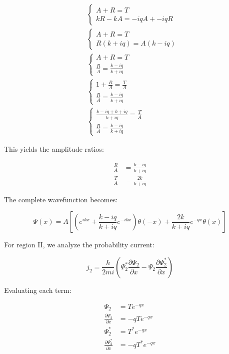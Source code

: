 \documentclass[italian]{HKNdocument}
\begin{document}
\begin{align*}
& \left\{\begin{array}{l}
A+R=T \\
k R-k A=-i q A+-i q R
\end{array}\right. \\
& \left\{\begin{array}{l}
A+R=T \\
R(k+i q)=A(k-i q)
\end{array}\right. \\
& \left\{\begin{array}{l}
A+R=T \\
\frac{R}{A}=\frac{k-i q}{k+i q}
\end{array}\right.  \tag{6.40}\\
& \left\{\begin{array}{l}
1+\frac{R}{A}=\frac{T}{A} \\
\frac{R}{A}=\frac{k-i q}{k+i q}
\end{array}\right. \\
& \left\{\begin{array}{l}
\frac{k-i q+k+i q}{k+i q}=\frac{T}{A} \\
\frac{R}{A}=\frac{k-i q}{k+i q}
\end{array}\right.
\end{align*}

This yields the amplitude ratios:

\begin{align*}
\frac{R}{A} & =\frac{k-i q}{k+i q} \\
\frac{T}{A} & =\frac{2 k}{k+i q} \tag{6.41}
\end{align*}

The complete wavefunction becomes:

\begin{equation*}
\Psi(x)=A\left[\left(e^{i k x}+\frac{k-i q}{k+i q} e^{-i k x}\right) \theta(-x)+\frac{2 k}{k+i q} e^{-q x} \theta(x)\right] \tag{6.42}
\end{equation*}

For region II, we analyze the probability current:

\begin{equation*}
j_{2}=\frac{\hbar}{2 m i}\left(\Psi_{2}^{*} \frac{\partial \Psi_{2}}{\partial x}-\Psi_{2} \frac{\partial \Psi_{2}^{*}}{\partial x}\right) \tag{6.43}
\end{equation*}

Evaluating each term:

\begin{align*}
\Psi_{2} & =T e^{-q x} \\
\frac{\partial \Psi_{2}}{\partial x} & =-q T e^{-q x} \\
\Psi_{2}^{*} & =T^{*} e^{-q x}  \tag{6.44}\\
\frac{\partial \Psi_{2}^{*}}{\partial x} & =-q T^{*} e^{-q x}
\end{align*}
\end{document}

